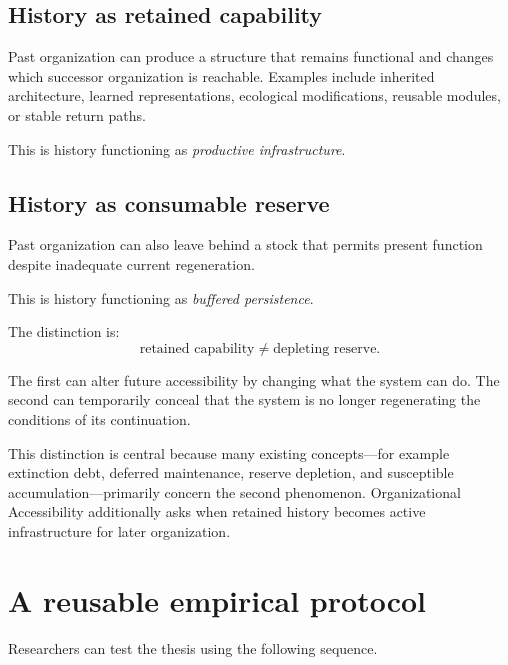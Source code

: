 \documentclass[11pt,a4paper]{article}
\begin{document}
\subsection*{History as retained capability}

Past organization can produce a structure that remains functional and changes which successor organization is reachable. Examples include inherited architecture, learned representations, ecological modifications, reusable modules, or stable return paths.

This is history functioning as \emph{productive infrastructure}.

\subsection*{History as consumable reserve}

Past organization can also leave behind a stock that permits present function despite inadequate current regeneration.

This is history functioning as \emph{buffered persistence}.

The distinction is:
\begin{equation}
\boxed{
\text{retained capability}
\neq
\text{depleting reserve}.
}
\label{eq:capability-vs-reserve}
\end{equation}

The first can alter future accessibility by changing what the system can do. The second can temporarily conceal that the system is no longer regenerating the conditions of its continuation.

This distinction is central because many existing concepts---for example extinction debt, deferred maintenance, reserve depletion, and susceptible accumulation---primarily concern the second phenomenon. Organizational Accessibility additionally asks when retained history becomes active infrastructure for later organization.

\section{A reusable empirical protocol}

Researchers can test the thesis using the following sequence.
\end{document}
